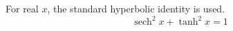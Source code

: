 \documentclass{article}
\DeclareMathOperator{\sech}{sech}
\begin{document}
For real $x$, the standard hyperbolic identity is used.
\begin{equation}
  \sech^2 x + \tanh^2 x = 1
\end{equation}
\end{document}
